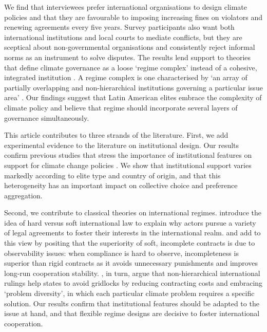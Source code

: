 \documentclass[a4paper,12pt]{article}
\begin{document}
We find that interviewees prefer international organisations to design climate policies and that they are favourable to imposing increasing fines on violators and renewing agreements every five years. Survey participants also want both international institutions and local courts to mediate conflicts, but they are sceptical about non-governmental organisations and consistently reject informal norms as an instrument to solve disputes. The results lend support to theories that define climate governance as a loose `regime complex' instead of a cohesive, integrated institution \citep{abbott2012transnational, colgan2012punctuated, de2014global, keohane2011regime}. A regime complex is one characterised by `an array of partially overlapping and non-hierarchical institutions governing a particular issue area' \citep[279]{raustiala2004regime}. Our findings suggest that Latin American elites embrace the complexity of climate policy and believe that regime should incorporate several layers of governance simultaneously. 

This article contributes to three strands of the literature. First, we add experimental evidence to the literature on institutional design. Our results confirm previous studies that stress the importance of institutional features on support for climate change policies \citep{bechtel2013mass, bechtel2017interests}. We show that institutional support varies markedly according to elite type and country of origin, and that this heterogeneity has an important impact on collective choice and preference aggregation.

Second, we contribute to classical theories on international regimes. \citet{abbott2000hard} introduce the idea of hard versus soft international law to explain why actors pursue a variety of legal agreements to foster their interests in the international realm. \citet{mildenberger2017beliefs} and \citet{rosendorff2001optimal} add to this view by positing that the superiority of soft, incomplete contracts is due to observability issues: when compliance is hard to observe, incompleteness is superior than rigid contracts as it avoids unnecessary punishments and improves long-run cooperation stability. \citet{keohane2011regime}, in turn, argue that non-hierarchical international rulings help states to avoid gridlocks by reducing contracting costs and embracing `problem diversity', in which each particular climate problem requires a specific solution. Our results confirm that institutional features should be adapted to the issue at hand, and that flexible regime designs are decisive to foster international cooperation.
\end{document}
